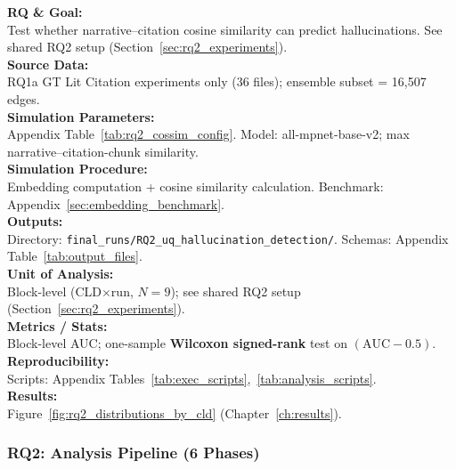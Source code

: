\textbf{RQ \& Goal:}\\
Test whether narrative--citation cosine similarity can predict hallucinations. See shared RQ2 setup (Section~\ref{sec:rq2_experiments}).\\
\textbf{Source Data:}\\
RQ1a GT Lit Citation experiments only (36 files); ensemble subset = 16,507 edges.\\
\textbf{Simulation Parameters:}\\
Appendix Table~\ref{tab:rq2_cossim_config}. Model: all-mpnet-base-v2; max narrative--citation-chunk similarity.\\
\textbf{Simulation Procedure:}\\
Embedding computation + cosine similarity calculation. Benchmark: Appendix~\ref{sec:embedding_benchmark}.\\
\textbf{Outputs:}\\
Directory: \texttt{final\_runs/RQ2\_uq\_hallucination\_detection/}. Schemas: Appendix Table~\ref{tab:output_files}.\\
\textbf{Unit of Analysis:}\\
Block-level (CLD$\times$run, $N=9$); see shared RQ2 setup (Section~\ref{sec:rq2_experiments}).\\
\textbf{Metrics / Stats:}\\
Block-level AUC; one-sample \textbf{Wilcoxon signed-rank} test on $(\mathrm{AUC}-0.5)$.\\
\textbf{Reproducibility:}\\
Scripts: Appendix Tables~\ref{tab:exec_scripts},~\ref{tab:analysis_scripts}.\\
\textbf{Results:}\\
Figure~\ref{fig:rq2_distributions_by_cld} (Chapter~\ref{ch:results}).

\subsubsection{RQ2: Analysis Pipeline (6 Phases)}
\label{sec:rq2_analysis}

